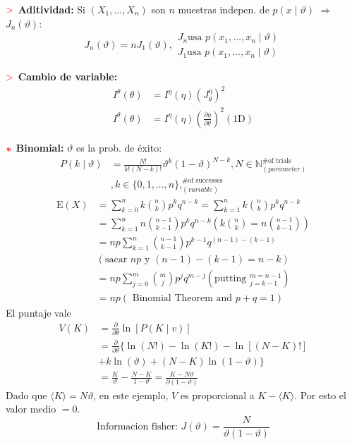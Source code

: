 \documentclass[%
 reprint,
 amsmath,amssymb,
 aps,
]{revtex4-1}
\begin{document}
\textbf{$\textcolor{red}{\mathbf{>}}$ Aditividad:} 
Si $\left(X_{1}, \ldots, X_{n}\right)$ son $n$ muestras indepen. de $p(x \mid \vartheta)$ $\Rightarrow$ $J_{n}(\vartheta)$:
$$
J_{n}(\vartheta)=n J_{1}(\vartheta), 
\begin{aligned}
  J_{n} \text{usa } p\left(x_{1}, \ldots, x_{n} \mid \vartheta\right) \\
  J_{1} \text{usa } p\left(x_{1}, \ldots, x_{n} \mid \vartheta\right)
\end{aligned}
$$

\textbf{$\textcolor{red}{\mathbf{>}}$ Cambio de variable:} 
$$
\begin{aligned}
I^{\theta}(\theta) &=I^{\eta}(\eta)\left(J_{\theta}^{\eta}\right)^{2} \\
I^{\theta}(\theta) &=I^{\eta}(\eta)\left( \frac{\partial \eta}{\partial \theta} \right)^{2} (\text{1D})
\end{aligned}
$$

\textbf{$\textcolor{red}{\color{red}{\boldsymbol{*}}}$ Binomial:} $\vartheta$ es la prob. de éxito:
$$
\begin{aligned}
  P(k \mid \vartheta)
  &=\frac{N !}{k !(N-k) !} \vartheta^{k}(1-\vartheta)^{N-k} , N \in \mathbb{N} ^\text{\# of trials}_{(parameter)}\\
  &, k \in\{0,1, \ldots, n\}, ^\text{\# of successes}_{(variable)}
\end{aligned}
$$
$$
\begin{aligned}
    \mathrm{E}(X) 
    &= \sum_{k=0}^{n} k {n \choose k} p^{k} q^{n-k} = \sum_{k=1}^{n} k {n \choose k} p^{k} q^{n-k} \\
    &= \sum_{k=1}^{n} n {n-1 \choose k-1} p^{k} q^{n-k} 
    \left( 
        k {n \choose k} =n {n-1 \choose k-1} 
    \right) 
    \\
    &=n p \sum_{k=1}^{n}{n-1 \choose k-1} p^{k-1} q^{(n-1)-(k-1)} 
    \\ &
    \left( 
        \text {sacar } n p \text { y }
        (n-1)-(k-1)=n-k
    \right) 
    \\
    &=n p \sum_{j=0}^{m} {m \choose j} p^{j} q^{m-j}
    \left( 
        \text{putting } 
        ^{m=n-1}_{j=k-1}
    \right) 
    \\
    &=n p \left( \text { Binomial Theorem and } p+q=1 \right) 
\end{aligned}
$$
El puntaje vale
$$
\begin{aligned}
V(K) &=\frac{\partial}{\partial \theta} \ln [P(K \mid v)] \\
&=\frac{\partial}{\partial \theta}\{\ln (N !)-\ln (K !)-\ln [(N-K) !] \\
&+k \ln (\vartheta)+(N-K) \ln (1-\vartheta)\} \\
&=\frac{K}{\vartheta}-\frac{N-K}{1-\vartheta}=\frac{K-N \vartheta}{\partial(1-\vartheta)}
\end{aligned}
$$
Dado que $\langle K\rangle=N \vartheta$, en este ejemplo, $V$ es proporcional a $K-\langle K\rangle$. Por esto el valor medio $=0$.
$$\text{Informacion fisher: }J(\vartheta)=\frac{N}{\vartheta(1-\vartheta)}$$
\end{document}
